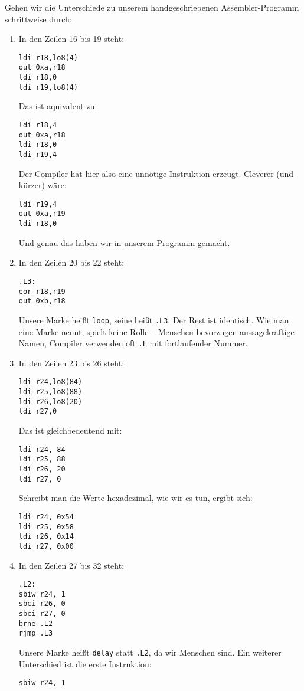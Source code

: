 \documentclass[a4paper,12pt]{article}
\begin{document}
\noindent
Gehen wir die Unterschiede zu unserem handgeschriebenen Assembler-Programm
schrittweise durch:

\begin{enumerate}
\item
In den Zeilen 16 bis 19 steht:
\begin{lstlisting}[language={[x86masm]Assembler}]
ldi r18,lo8(4)
out 0xa,r18
ldi r18,0
ldi r19,lo8(4)
\end{lstlisting}

\noindent
Das ist äquivalent zu:
\begin{lstlisting}[language={[x86masm]Assembler}]
ldi r18,4
out 0xa,r18
ldi r18,0
ldi r19,4
\end{lstlisting}
Der Compiler hat hier also eine unnötige Instruktion erzeugt. Cleverer (und
kürzer) wäre:
\begin{lstlisting}[language={[x86masm]Assembler}]
ldi r19,4
out 0xa,r19
ldi r18,0
\end{lstlisting}
Und genau das haben wir in unserem Programm gemacht.

\item
In den Zeilen 20 bis 22 steht:
\begin{lstlisting}[language={[x86masm]Assembler}]
.L3:
eor r18,r19
out 0xb,r18
\end{lstlisting}
Unsere Marke heißt \texttt{loop}, seine heißt \texttt{.L3}. Der Rest ist
identisch. Wie man eine Marke nennt, spielt keine Rolle – Menschen bevorzugen
aussagekräftige Namen, Compiler verwenden oft \texttt{.L} mit fortlaufender
Nummer.

\item
In den Zeilen 23 bis 26 steht:
\begin{lstlisting}[language={[x86masm]Assembler}]
ldi r24,lo8(84)
ldi r25,lo8(88)
ldi r26,lo8(20)
ldi r27,0
\end{lstlisting}
Das ist gleichbedeutend mit:
\begin{lstlisting}[language={[x86masm]Assembler}]
ldi r24, 84
ldi r25, 88
ldi r26, 20
ldi r27, 0
\end{lstlisting}
Schreibt man die Werte hexadezimal, wie wir es tun, ergibt sich:
\begin{lstlisting}[language={[x86masm]Assembler}]
ldi r24, 0x54
ldi r25, 0x58
ldi r26, 0x14
ldi r27, 0x00
\end{lstlisting}

\item
In den Zeilen 27 bis 32 steht:
\begin{lstlisting}[language={[x86masm]Assembler}]
.L2:
sbiw r24, 1
sbci r26, 0
sbci r27, 0
brne .L2
rjmp .L3
\end{lstlisting}
Unsere Marke heißt \texttt{delay} statt \texttt{.L2}, da wir Menschen sind.
Ein weiterer Unterschied ist die erste Instruktion:
\begin{lstlisting}[language={[x86masm]Assembler}]
sbiw r24, 1
\end{lstlisting}


\end{enumerate}
\end{document}
